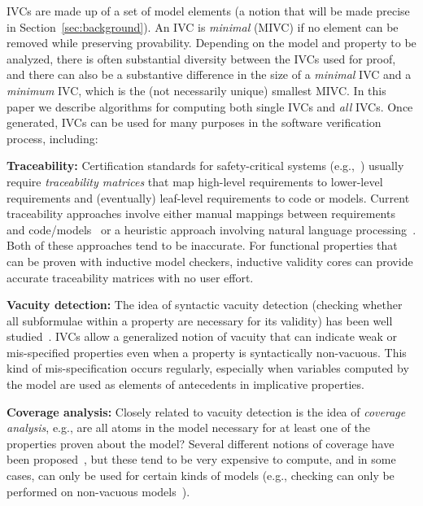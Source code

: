 

IVCs are made up of a set of model elements (a notion that will be made precise in Section~\ref{sec:background}).  An IVC is {\em minimal} (MIVC) if no element can be removed while preserving provability.  Depending on the model and property to be analyzed, there is often substantial diversity between the IVCs used for proof, and there can also be a substantive difference in the size of a {\em minimal} IVC and a {\em minimum} IVC, which is the (not necessarily unique) smallest MIVC.  In this paper we describe algorithms for computing both single IVCs and {\em all} IVCs.  Once generated, IVCs can be used for many purposes in the software verification process, including:

\noindent \textbf{Traceability:} Certification standards for safety-critical systems (e.g.,~\cite{DO178C, MOD:00-55}) usually require {\em traceability matrices} that map high-level requirements to lower-level requirements and (eventually) leaf-level requirements to code or models.  Current traceability approaches involve either manual mappings between requirements and code/models~\cite{SimulinkTraceability} or a heuristic approach involving natural language processing~\cite{Keenan12:Tracelab}.  Both of these approaches tend to be inaccurate.  For functional properties that can be proven with inductive model checkers, inductive validity cores can provide accurate traceability matrices with no user effort.

\noindent \textbf{Vacuity detection:} The idea of syntactic vacuity detection (checking whether all subformulae within a property are necessary for its validity) has been well studied~\cite{Kupferman03:Vacuity}.   IVCs allow a generalized notion of vacuity that can indicate weak or mis-specified properties even when a property is syntactically non-vacuous.   This kind of mis-specification occurs regularly, especially when variables computed by the model are used as elements of antecedents in implicative properties.

\noindent \textbf{Coverage analysis:} Closely related to vacuity detection is the idea of {\em coverage analysis}, e.g., are all atoms in the model necessary for at least one of the properties proven about the model?  Several different notions of coverage have been proposed~\cite{chockler_coverage_2003, kupferman_theory_2008}, but these tend to be very expensive to compute, and in some cases, can only be used for certain kinds of models (e.g., checking can only be performed on non-vacuous models~\cite{kupferman_theory_2008}).


